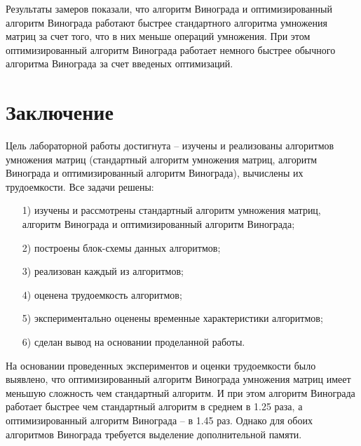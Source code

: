 \documentclass[a4paper,14pt, unknownkeysallowed]{extreport}
\begin{document}
Результаты замеров показали, что алгоритм Винограда и оптимизированный алгоритм Винограда работают быстрее стандартного алгоритма умножения матриц за счет того, что в них меньше операций умножения. При этом оптимизированный алгоритм Винограда работает немного быстрее обычного алгоритма Винограда за счет введеных оптимизаций.
	
\chapter*{Заключение}

Цель лабораторной работы достигнута -- изучены и реализованы алгоритмов умножения матриц (стандартный алгоритм умножения матриц, алгоритм Винограда и оптимизированный алгоритм Винограда), вычислены их трудоемкости. Все задачи решены:

\begin{enumerate}
	\item[1)] изучены и рассмотрены стандартный алгоритм умножения матриц, алгоритм Винограда и оптимизированный алгоритм Винограда; 
	\item[2)] построены блок-схемы данных алгоритмов;
	\item[3)] реализован каждый из алгоритмов;
	\item[4)] оценена трудоемкость алгоритмов;
	\item[5)] экспериментально оценены временные характеристики алгоритмов;
	\item[6)] сделан вывод на основании проделанной работы.
\end{enumerate}
	
На основании проведенных экспериментов и оценки трудоемкости было выявлено, что оптимизированный алгоритм Винограда умножения матриц имеет меньшую сложность чем стандартный алгоритм. И при этом алгоритм Винограда работает быстрее чем стандартный алгоритм в среднем в 1.25 раза, а оптимизированный алгоритм Винограда -- в 1.45 раз. Однако для обоих алгоритмов Винограда требуется выделение дополнительной памяти. 

	

\nocite{*} 

\renewcommand\bibname{Список использованных источников} %
	
\end{document}
